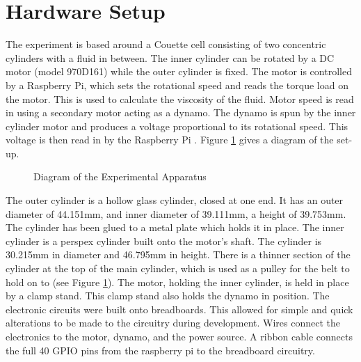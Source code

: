 \documentclass[twoside,a4]{report}
\def\br{\newline \newline \noindent}
\def\rpi{Raspberry Pi }
\begin{document}
	\section{Hardware Setup} %
	The experiment is based around a Couette cell consisting of two concentric cylinders with a fluid in between. The inner cylinder can be rotated by a DC motor (model 970D161) while the outer cylinder is fixed. The motor is controlled by a Raspberry Pi, which sets the rotational speed and reads the torque load on the motor. This is used to calculate the viscosity of the fluid. Motor speed is read in using a secondary motor acting as a dynamo. The dynamo is spun by the inner cylinder motor and produces a voltage proportional to its rotational speed. This voltage is then read in by the \rpi.
	Figure \ref{expdia} gives a diagram of the set-up.\newline
	\begin{figure}[!htb]
	\centering
	\caption{Diagram of the Experimental Apparatus}
	\label{expdia}
	\end{figure} \newline \noindent
	The outer cylinder is a hollow glass cylinder, closed at one end. It has an outer diameter of 44.151mm, and inner diameter of 39.111mm, a height of 39.753mm. The cylinder has been glued to a metal plate which holds it in place. \br
	The inner cylinder is a perspex cylinder built onto the motor's shaft. The cylinder is 30.215mm in diameter and 46.795mm in height. There is a thinner section of the cylinder at the top of the main cylinder, which is used as a pulley for the belt to hold on to (see Figure \ref{expdia}). \br
	The motor, holding the inner cylinder, is held in place by a clamp stand. This clamp stand also holds the dynamo in position.\br
	The electronic circuits were built onto breadboards. This allowed for simple and quick alterations to be made to the circuitry during development. Wires connect the electronics to the motor, dynamo, and the power source. A ribbon cable connects the full 40 GPIO pins from the raspberry pi to the breadboard circuitry.
	
\end{document}
